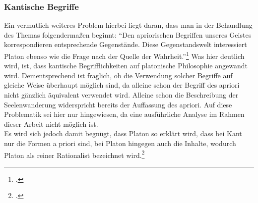 \subsubsection{Kantische Begriffe}
Ein vermutlich weiteres Problem hierbei liegt daran, dass man in der Behandlung des Themas folgendermaßen beginnt: \enquote{Den apriorischen Begriffen unseres Geistes korrespondieren entsprechende Gegenstände. Diese Gegenstandswelt interessiert Platon ebenso wie die Frage nach der Quelle der Wahrheit.}\footcite[][S. 97]{Hirschberger}
Was hier deutlich wird, ist, dass kantische Begrifflichkeiten auf platonische Philosophie angewandt wird. Dementsprechend ist fraglich, ob die Verwendung solcher Begriffe auf gleiche Weise überhaupt möglich sind, da alleine schon der Begriff des apriori nicht gänzlich äquivalent verwendet wird. Alleine schon die Beschreibung der Seelenwanderung widerspricht bereits der Auffassung des apriori. Auf diese Problematik sei hier nur hingewiesen, da eine ausführliche Analyse im Rahmen dieser Arbeit nicht möglich ist.\\Es wird sich jedoch damit begnügt, dass Platon so erklärt wird, dass bei Kant nur die Formen a priori sind, bei Platon hingegen auch die Inhalte, wodurch Platon als reiner Rationalist bezeichnet wird.\footcite[vgl.][S.96]{Hirschberger} 


